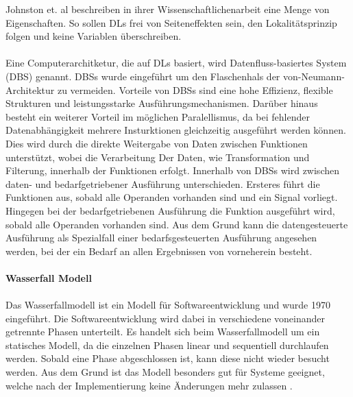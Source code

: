 \documentclass{article}
\begin{document}
    Johnston et. al beschreiben in ihrer Wissenschaftlichenarbeit eine Menge von Eigenschaften. So sollen DLs frei von Seiteneffekten sein, den Lokalitätsprinzip folgen und keine Variablen überschreiben.\cite{2}\\
    \\    
    Eine Computerarchitketur, die auf DLs basiert, wird Datenfluss-basiertes System (DBS) genannt.
    DBSs wurde eingeführt um den Flaschenhals der von-Neumann-Architektur zu vermeiden. \cite{8} %
    Vorteile von DBSs sind eine hohe Effizienz, flexible Strukturen und leistungsstarke Ausführungsmechanismen. \cite{1}
    Darüber hinaus besteht ein weiterer Vorteil im möglichen Paralellismus, da bei fehlender Datenabhängigkeit mehrere Insturktionen gleichzeitig ausgeführt werden können. \cite{1}
    Dies wird durch die direkte Weitergabe von Daten zwischen Funktionen unterstützt, wobei die Verarbeitung Der Daten, wie Transformation und Filterung, innerhalb der Funktionen erfolgt. \cite{15}
    Innerhalb von DBSs wird zwischen daten- und bedarfgetriebener Ausführung unterschieden. 
    Ersteres führt die Funktionen aus, sobald alle Operanden vorhanden sind und ein Signal vorliegt. 
    Hingegen bei der bedarfgetriebenen Ausführung die Funktion ausgeführt wird, sobald alle Operanden vorhanden sind. \cite{2}
    Aus dem Grund kann die datengesteuerte Ausführung als Spezialfall einer bedarfsgesteuerten Ausführung angesehen werden, bei der ein Bedarf an allen Ergebnissen von vorneherein besteht. \cite{11}\\
    \\
    \textbf{Wasserfall Modell}\\
    \\
    Das Wasserfallmodell ist ein Modell für Softwareentwicklung \cite{24} und wurde 1970 eingeführt. \cite{25} 
    Die Softwareentwicklung wird dabei in verschiedene voneinander getrennte Phasen unterteilt. \cite{22} 
    Es handelt sich beim Wasserfallmodell um ein statisches Modell, da die einzelnen Phasen linear und sequentiell durchlaufen werden. \cite{22} 
    Sobald eine Phase abgeschlossen ist, kann diese nicht wieder besucht werden. \cite{22} 
    Aus dem Grund ist das Modell besonders gut für Systeme geeignet, welche nach der Implementierung keine Änderungen mehr zulassen \cite{22}. 
\end{document}
